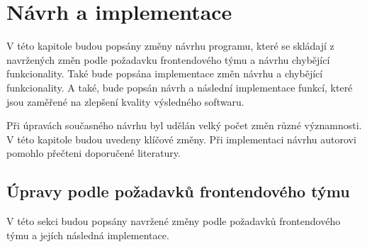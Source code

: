 \chapter{Návrh a implementace}\label{navrh}
V této kapitole budou popsány změny návrhu programu, které se skládají z navržených změn podle požadavku frontendového týmu a návrhu chybějící funkcionality. Také bude popsána implementace změn návrhu a chybějící funkcionality. A také, bude popsán návrh a následní implementace funkcí, které jsou zaměřené na zlepšení kvality výsledného softwaru.

Při úpravách současného návrhu byl udělán velký počet změn různé významnosti. V této kapitole budou uvedeny klíčové změny. Při implementaci návrhu autorovi pomohlo přečteni doporučené literatury.\cite{pro-spring-boot-2}

\section{Úpravy podle požadavků frontendového týmu}\label{navrh:upravy}
    V této sekci budou popsány navržené změny podle požadavků frontendového týmu a jejích následná implementace.
    
